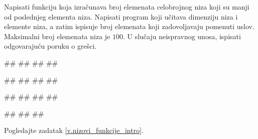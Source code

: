 \ifresenja
\begin{Answer}[ref=v.nizovi_funkcije_intro]
\end{Answer}
\fi


\begin{Exercise}[label=p.broj_manjih_od_poslednjeg] 
 Napisati funkciju koja izračunava broj elemenata celobrojnog niza koji su
 manji od poslednjeg elementa niza. 
 Napisati program koji učitava dimenziju niza i elemente niza, a zatim ispisuje broj
 elemenata koji zadovoljavaju pomenuti uslov.
 Maksimalni broj elemenata niza je $100$.
 U slučaju neispravnog unosa, ispisati odgovarajuću poruku o grešci. 

\begin{miditest}
\begin{upotreba}{1}
#\naslovInt#
##
##
##
\end{upotreba}
\end{miditest}
\begin{miditest}
\begin{upotreba}{2}
#\naslovInt#
##
##
##
\end{upotreba}
\end{miditest}

\begin{miditest}
\begin{upotreba}{3}
#\naslovInt#
##
##
##
\end{upotreba}
\end{miditest}
\begin{miditest}
\begin{upotreba}{4}
#\naslovInt#
##
##
\end{upotreba}
\end{miditest}

\end{Exercise}

\ifresenja
\begin{Answer}[ref=p.broj_manjih_od_poslednjeg]

Pogledajte zadatak \ref{v.nizovi_funkcije_intro}.
\end{Answer}
\fi


